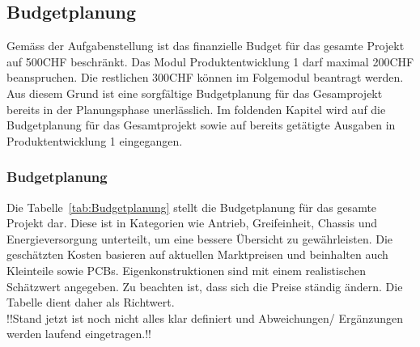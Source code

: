 \documentclass[main.tex]{subfiles} %
\begin{document}

\subsection{Budgetplanung}

Gemäss der Aufgabenstellung ist das finanzielle Budget für das gesamte Projekt auf 500CHF beschränkt.
Das Modul Produktentwicklung 1 darf maximal 200CHF beanspruchen. Die restlichen 300CHF können im
Folgemodul beantragt werden.
Aus diesem Grund ist eine sorgfältige Budgetplanung für das Gesamprojekt bereits in der Planungsphase
unerlässlich. Im foldenden Kapitel wird auf die Budgetplanung für das Gesamtprojekt
sowie auf bereits getätigte Ausgaben in Produktentwicklung 1 eingegangen.

\subsubsection*{Budgetplanung}
Die Tabelle~\ref{tab:Budgetplanung} stellt die Budgetplanung für das gesamte Projekt dar. Diese ist in
Kategorien wie Antrieb, Greifeinheit, Chassis und Energieversorgung unterteilt, um eine
bessere Übersicht zu gewährleisten. Die geschätzten Kosten basieren auf aktuellen Marktpreisen und
beinhalten auch Kleinteile sowie PCBs. Eigenkonstruktionen sind mit einem realistischen
Schätzwert angegeben. Zu beachten ist, dass sich die Preise ständig ändern. Die Tabelle dient daher
als Richtwert.\\

!!Stand jetzt ist noch nicht alles klar definiert und Abweichungen/ Ergänzungen werden laufend eingetragen.!!

\newpage
\end{document}
